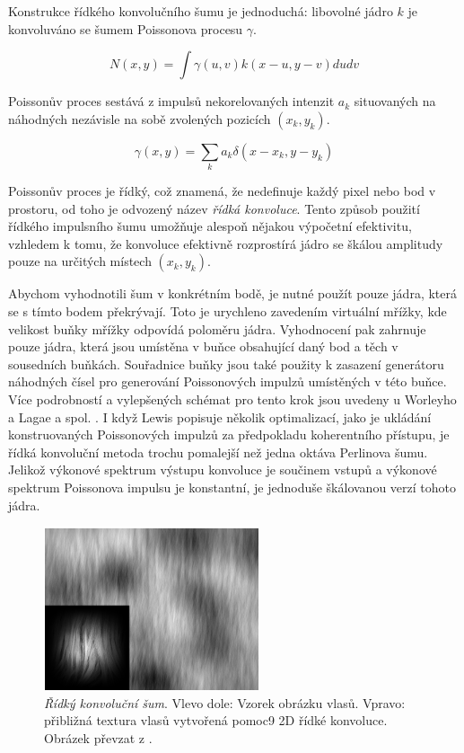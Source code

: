 Konstrukce řídkého konvolučního šumu je jednoduchá: libovolné jádro $k$ je konvoluváno se šumem Poissonova procesu $\gamma$.

\[N(x,y) = \int\gamma(u,v)k(x-u,y-v)dudv\]

Poissonův proces sestává z impulsů nekorelovaných intenzit $a_k$ situovaných na náhodných nezávisle na sobě zvolených pozicích $(x_k,y_k)$.

\[\gamma(x,y) = \sum_k a_k \delta(x-x_k,y-y_k)\]

Poissonův proces je řídký, což znamená, že nedefinuje každý pixel nebo bod v prostoru, od toho je odvozený název \textit{řídká konvoluce}. Tento způsob použití řídkého impulsního šumu umožňuje alespoň nějakou výpočetní efektivitu, vzhledem k tomu, že konvoluce efektivně rozprostírá jádro se škálou amplitudy pouze na určitých místech $(x_k, y_k)$.

Abychom vyhodnotili šum v konkrétním bodě, je nutné použít pouze jádra, která se s tímto bodem překrývají. Toto je urychleno zavedením virtuální mřížky, kde velikost buňky mřížky odpovídá poloměru jádra. Vyhodnocení pak zahrnuje pouze jádra, která jsou umístěna v buňce obsahující daný bod a těch v sousedních buňkách. Souřadnice buňky jsou také použity k zasazení generátoru náhodných čísel pro generování Poissonových impulzů umístěných v této buňce. Více podrobností a vylepšených schémat pro tento krok jsou uvedeny u Worleyho \cite{worley1996} a Lagae a spol. \cite{Lagae09}. I když Lewis \cite{Lewis89} popisuje několik optimalizací, jako je ukládání konstruovaných Poissonových impulzů za předpokladu koherentního přístupu, je řídká konvoluční metoda trochu pomalejší než jedna oktáva Perlinova šumu. Jelikož výkonové spektrum výstupu konvoluce je součinem vstupů a výkonové spektrum Poissonova impulsu je konstantní, je jednoduše škálovanou verzí tohoto jádra.

\begin{figure}[H]
	\centering
	\includegraphics[scale=1]{obrazky-figures/SparseConvolutionNoise.png}
	\caption{\textit{Řídký konvoluční šum}. Vlevo dole: Vzorek obrázku vlasů. Vpravo: přibližná textura vlasů vytvořená pomoc9 2D řídké konvoluce. Obrázek převzat z \cite{Lagae10}.}
	\label{fig:SparseConvolutionNoise}
\end{figure}

